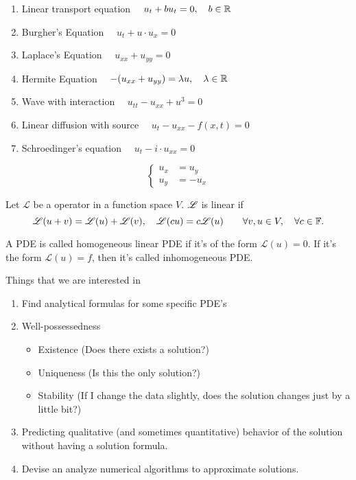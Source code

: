 \begin{example}
	\begin{enumerate}
		\item Linear transport equation $ \quad u_t + bu_t = 0, \quad b \in \mathbb R$

		\item Burgher's Equation 
		$\quad u_t + u \cdot u_x = 0$
		\item Laplace's Equation
		$\quad u_{xx} + u_{yy} = 0$
		\item Hermite Equation
		$\quad -(u_{xx} + u_{yy}) = \lambda u, \quad \lambda \in \mathbb R$
		\item Wave with interaction
		$\quad u_{tt} - u_{xx} + u^3 = 0$
		\item Linear diffusion with source
		$\quad u_t - u_{xx} - f(x,t) = 0$
		\item Schroedinger's equation 
		$\quad u_t - i \cdot u_{xx} = 0$
	\end{enumerate}
\end{example}
\begin{example}
	\[ \left\{ \begin{array}{cc}
		u_x &= u_y \\
		u_y &= -u_x
	\end{array} \right.\]
\end{example}
\begin{definition}
	Let $\mathscr L$ be a operator in a function space $V$. $\mathscr L$ is linear if  
	\[\mathscr L(u + v) = \mathscr L (u) + \mathscr L(v), \quad \mathscr L(cu) = c\mathscr L(u) \qquad  \forall v,u \in V, \quad \forall c \in \mathbb F.\]
\end{definition}
\begin{definition}
	A PDE is called homogeneous linear PDE if it's of the form $\mathscr L(u) = 0$. If it's the form $\mathscr L(u) = f$, then it's called inhomogeneous PDE.
\end{definition} 
\begin{remark}
	Things that we are interested in
	\begin{enumerate}
		\item Find analytical formulas for some specific PDE's
		\item Well-possessedness
		\begin{itemize}
			\item Existence (Does there exists a solution?)
			\item Uniqueness (Is this the only solution?)
			\item Stability (If I change the data slightly, does the solution changes just by a little bit?)
		\end{itemize}
		\item Predicting qualitative (and sometimes quantitative) behavior of the solution without having a solution formula. 
		\item Devise an analyze numerical algorithms to approximate solutions.
	\end{enumerate}
\end{remark}
